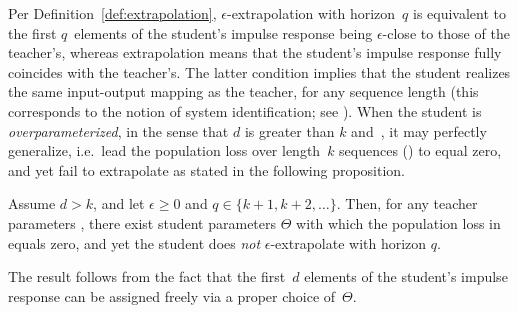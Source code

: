 Per Definition~\ref{def:extrapolation}, $\epsilon$-extrapolation with horizon~$q$ is equivalent to the first $q$~elements of the student's impulse response being $\epsilon$-close to those of the teacher's, whereas extrapolation means that the student's impulse response fully coincides with the teacher's.
The latter condition implies that the student realizes the same input-output mapping as the teacher, for any sequence length (this corresponds to the notion of system identification; see ).
When the student is \emph{overparameterized}, in the sense that $d$ is greater than $k$ and~, it may perfectly generalize, i.e.~lead the population loss over length~$k$ sequences () to equal zero, and yet fail to extrapolate as stated in the following proposition.
\begin{proposition}\label{prop:symmetric_lds_expressivity}
Assume $d > k$, and let $\epsilon \geq 0$ and $q \in \{ k + 1 , k + 2 , \ldots\}$.
Then, for any teacher parameters \smash{$\hat{\Theta}$}, there exist student parameters $\Theta$ with which the population loss in  equals zero, and yet the student does \emph{not} $\epsilon$-extrapolate with horizon $q$.
\end{proposition}
\begin{sproof}
The result follows from the fact that the first~$d$ elements of the student's impulse response can be assigned freely via a proper choice of~$\Theta$.
\end{sproof}
